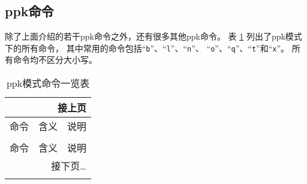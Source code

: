 \subsection{ppk命令}
除了上面介绍的若干ppk命令之外，还有很多其他ppk命令。
表 \ref{table:plotpk-commands} 列出了ppk模式下的所有命令，
其中常用的命令包括``\texttt{b}''、``\texttt{l}''、``\texttt{n}''、
``\texttt{o}''、``\texttt{q}''、``\texttt{t}''和``\texttt{x}''。
所有命令均不区分大小写。

\begin{center}
\small\ttfamily
\begin{longtable}{cll}
\multicolumn{3}{r}{接上页} \\
\toprule
命令    &   含义    &   说明    \\
\midrule
\endhead
\caption{ppk模式命令一览表} \label{table:plotpk-commands}   \\
\toprule
命令    &   含义    &   说明    \\
\midrule
\endfirsthead
\bottomrule
\multicolumn{3}{r}{接下页\dots} \\
\endfoot
\bottomrule
\endlastfoot


\end{longtable}
\end{center}
